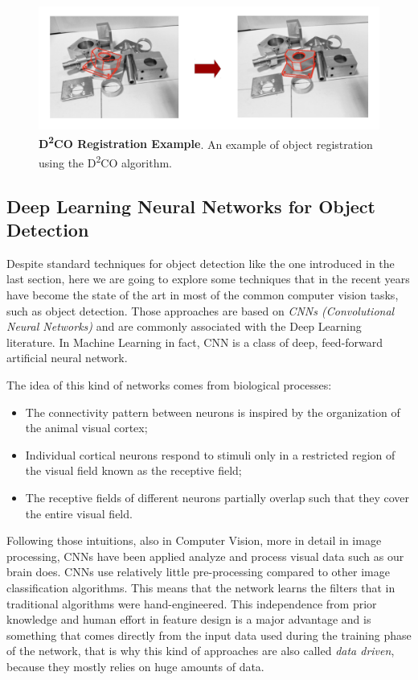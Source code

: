 \begin{figure}
    \centering
    \includegraphics[width=\textwidth]{figures/1_perception_and_sensing_in_robotics/d2co_02}
    \caption{\textbf{D\textsuperscript{2}{CO} Registration Example}. An example of object registration using the D\textsuperscript{2}{CO} algorithm.} 
    \label{fig:d2co_02}
\end{figure}

\subsection{Deep Learning Neural Networks for Object Detection}\label{subsec:dl_obj_detection}
Despite standard techniques for object detection like the one introduced in the last section, here we are going to explore some techniques that in the recent years have become the state of the art in most of the common computer vision tasks, such as object detection. Those approaches are based on \emph{CNNs (Convolutional Neural Networks)} and are commonly associated with the Deep Learning literature. In Machine Learning in fact, CNN is a class of deep, feed-forward artificial neural network. 

The idea of this kind of networks comes from biological processes: 

\begin{itemize}
	\item The connectivity pattern between neurons is inspired by the organization of the animal visual cortex; 	
	\item Individual cortical neurons respond to stimuli only in a restricted region of the visual field known as the receptive field; 
	\item The receptive fields of different neurons partially overlap such that they cover the entire visual field.
\end{itemize}

Following those intuitions, also in Computer Vision, more in detail in image processing, CNNs have been applied analyze and process visual data such as our brain does. CNNs use relatively little pre-processing compared to other image classification algorithms. This means that the network learns the filters that in traditional algorithms were hand-engineered. This independence from prior knowledge and human effort in feature design is a major advantage and is something that comes directly from the input data used during the training phase of the network, that is why this kind of approaches are also called \emph{data driven}, because they mostly relies on huge amounts of data.

